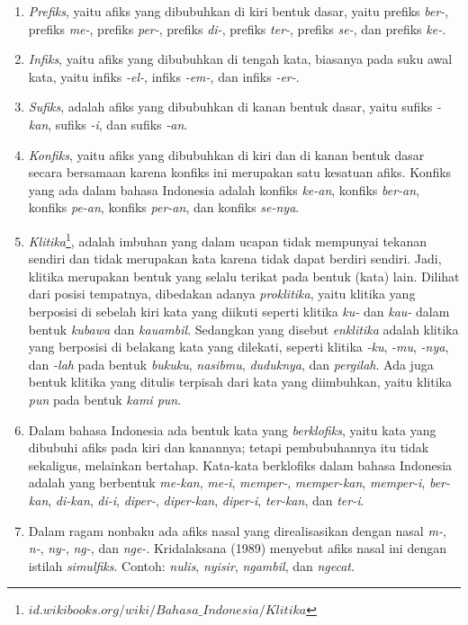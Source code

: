 \begin{enumerate}
	\item \textit{Prefiks}, yaitu afiks yang dibubuhkan di kiri bentuk dasar, yaitu prefiks \textit{ber-}, prefiks \textit{me-}, prefiks \textit{per-}, prefiks \textit{di-}, prefiks \textit{ter-}, prefiks \textit{se-}, dan prefiks \textit{ke-}.
	
	\item \textit{Infiks}, yaitu afiks yang dibubuhkan di tengah kata, biasanya pada suku awal kata, yaitu infiks \textit{-el-}, infiks \textit{-em-}, dan infiks \textit{-er-}.
	
	\item \textit{Sufiks}, adalah afiks yang dibubuhkan di kanan bentuk dasar, yaitu sufiks \textit{-kan}, sufiks \textit{-i}, dan sufiks \textit{-an}.
	
	\item \textit{Konfiks}, yaitu afiks yang dibubuhkan di kiri dan di kanan bentuk dasar secara bersamaan karena konfiks ini merupakan satu kesatuan afiks. Konfiks yang ada dalam bahasa Indonesia adalah konfiks \textit{ke-an}, konfiks \textit{ber-an}, konfiks \textit{pe-an}, konfiks \textit{per-an}, dan konfiks \textit{se-nya}.
	
	\item \textit{Klitika}\footnote{$id.wikibooks.org/wiki/Bahasa\_Indonesia/Klitika$}, adalah imbuhan yang dalam ucapan tidak mempunyai tekanan sendiri dan tidak merupakan kata karena tidak dapat berdiri sendiri. Jadi, klitika merupakan bentuk yang selalu terikat pada bentuk (kata) lain. Dilihat dari posisi tempatnya, dibedakan adanya \textit{proklitika}, yaitu klitika yang berposisi di sebelah kiri kata yang diikuti seperti klitika \textit{ku-} dan \textit{kau-} dalam bentuk \textit{kubawa} dan \textit{kauambil}. Sedangkan yang disebut \textit{enklitika} adalah klitika yang berposisi di belakang kata yang dilekati, seperti klitika \textit{-ku}, \textit{-mu}, \textit{-nya}, dan \textit{-lah} pada bentuk \textit{bukuku}, \textit{nasibmu}, \textit{duduknya}, dan \textit{pergilah}. Ada juga bentuk klitika yang ditulis terpisah dari kata yang diimbuhkan, yaitu klitika \textit{pun} pada bentuk \textit{kami pun}.
	
	\item Dalam bahasa Indonesia ada bentuk kata yang \textit{berklofiks}, yaitu kata yang dibubuhi afiks pada kiri dan kanannya; tetapi pembubuhannya itu tidak sekaligus, melainkan bertahap. Kata-kata berklofiks dalam bahasa Indonesia adalah yang berbentuk \textit{me-kan}, \textit{me-i}, \textit{memper-}, \textit{memper-kan}, \textit{memper-i}, \textit{ber-kan}, \textit{di-kan}, \textit{di-i}, \textit{diper-}, \textit{diper-kan}, \textit{diper-i}, \textit{ter-kan}, dan \textit{ter-i}.
	
	\item Dalam ragam nonbaku ada afiks nasal yang direalisasikan dengan nasal \textit{m-}, \textit{n-}, \textit{ny-}, \textit{ng-}, dan \textit{nge-}. Kridalaksana (1989) menyebut afiks nasal ini dengan istilah \textit{simulfiks}. Contoh: \textit{nulis}, \textit{nyisir}, \textit{ngambil}, dan \textit{ngecat}.
\end{enumerate}



